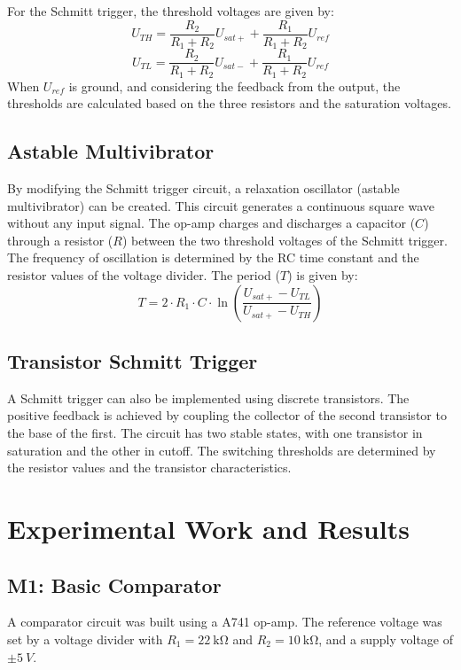 \documentclass[12pt,a4paper]{article}
\begin{document}
For the Schmitt trigger, the threshold voltages are given by:
\begin{equation}
    U_{TH} = \frac{R_2}{R_1+R_2}U_{sat+} + \frac{R_1}{R_1+R_2}U_{ref}
\end{equation}
\begin{equation}
    U_{TL} = \frac{R_2}{R_1+R_2}U_{sat-} + \frac{R_1}{R_1+R_2}U_{ref}
\end{equation}
When $U_{ref}$ is ground, and considering the feedback from the output, the thresholds are calculated based on the three resistors and the saturation voltages.

\subsection{Astable Multivibrator}
By modifying the Schmitt trigger circuit, a relaxation oscillator (astable multivibrator) can be created. This circuit generates a continuous square wave without any input signal. The op-amp charges and discharges a capacitor ($C$) through a resistor ($R$) between the two threshold voltages of the Schmitt trigger. The frequency of oscillation is determined by the RC time constant and the resistor values of the voltage divider. The period ($T$) is given by:
\begin{equation}
    T = 2 \cdot R_1 \cdot C \cdot \ln\left(\frac{U_{sat+} - U_{TL}}{U_{sat+} - U_{TH}}\right)
\end{equation}

\subsection{Transistor Schmitt Trigger}
A Schmitt trigger can also be implemented using discrete transistors. The positive feedback is achieved by coupling the collector of the second transistor to the base of the first. The circuit has two stable states, with one transistor in saturation and the other in cutoff. The switching thresholds are determined by the resistor values and the transistor characteristics.

\section{Experimental Work and Results}

\subsection{M1: Basic Comparator}
A comparator circuit was built using a \textmu A741 op-amp. The reference voltage was set by a voltage divider with $R_1 = \SI{22}{\kilo\ohm}$ and $R_2 = \SI{10}{\kilo\ohm}$, and a supply voltage of $\pm\SI{5}{V}$.
\end{document}

